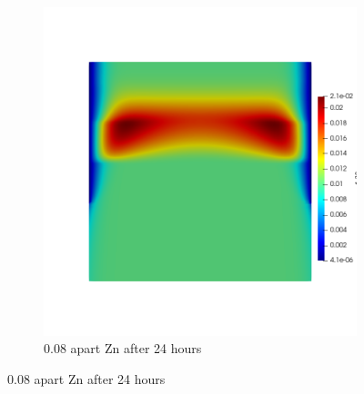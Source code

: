 \documentclass[11pt]{article}
\numberwithin{equation}{section}
\begin{document}
\begin{figure}[h]
\begin{subfigure}[t]{0.45\textwidth}
     \includegraphics[width=\textwidth]{Figures/testpics/BasicZn.png}
     \caption{0.08 apart Zn after 24 hours}
     \end{subfigure}
 \end{figure}
\FloatBarrier
\end{document}
